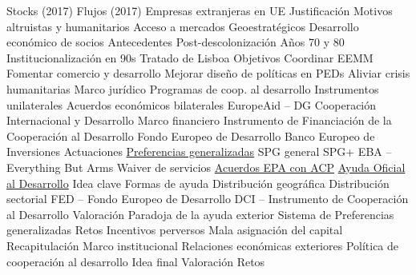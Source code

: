 \documentclass{nuevotema}
\begin{document}
\begin{esquema}[enumerate]
			\3 Stocks (2017)
			\3 Flujos (2017)
			\3 Empresas extranjeras en UE
	\1 
		\2 Justificación
			\3 Motivos altruistas y humanitarios
			\3 Acceso a mercados
			\3 Geoestratégicos
			\3 Desarrollo económico de socios
		\2 Antecedentes
			\3 Post-descolonización
			\3 Años 70 y 80
			\3 Institucionalización en 90s
			\3 Tratado de Lisboa
		\2 Objetivos
			\3 Coordinar EEMM
			\3 Fomentar comercio y desarrollo
			\3 Mejorar diseño de políticas en PEDs
			\3 Aliviar crisis humanitarias
		\2 Marco jurídico
			\3 Programas de coop. al desarrollo
			\3 Instrumentos unilaterales
			\3 Acuerdos económicos bilaterales
			\3 EuropeAid -- DG Cooperación Internacional y Desarrollo
		\2 Marco financiero
			\3 Instrumento de Financiación de la Cooperación al Desarrollo
			\3 Fondo Europeo de Desarrollo
			\3 Banco Europeo de Inversiones
		\2 Actuaciones
			\3 \underline{Preferencias generalizadas}
			\3[] SPG general
			\3 SPG+
			\3 EBA -- Everything But Arms
			\3 Waiver de servicios
			\3 \underline{Acuerdos EPA con ACP}
			\3[] \underline{Ayuda Oficial al Desarrollo}
			\3 Idea clave
			\3 Formas de ayuda
			\3 Distribución geográfica
			\3 Distribución sectorial
			\3 FED -- Fondo Europeo de Desarrollo
			\3 DCI -- Instrumento de Cooperación al Desarrollo
		\2 Valoración
			\3 Paradoja de la ayuda exterior
			\3 Sistema de Preferencias generalizadas
		\2 Retos
			\3 Incentivos perversos
			\3 Mala asignación del capital
	\1[] 
		\2 Recapitulación
			\3 Marco institucional
			\3 Relaciones económicas exteriores
			\3 Política de cooperación al desarrollo
		\2 Idea final
			\3 Valoración
			\3 Retos

\end{esquema}

\esquemalargo
\end{document}
